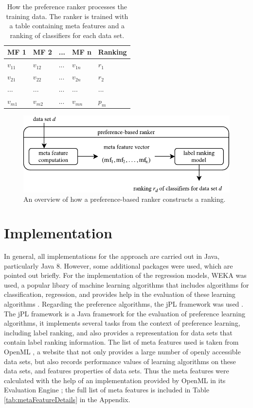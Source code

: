 \begin{table}[h]
\centering
	\begin{tabularx}{\textwidth}{X | X | X | X | X}
		MF 1				& MF 2				& ... 	& MF n				& Ranking 	\\ \hline
		$v_{11}$			& $v_{12}$			& ...	& $v_{1n}$			& $r_1$		\\ 
		$v_{21}$			& $v_{22}$			& ...	& $v_{2n}$			& $r_2$		\\
		...				& ...				& ...	& ...				& ...		\\
		$v_{m1}$			& $v_{m2}$			& ... 	& $v_{mn}$			& $p_m$		 
	\end{tabularx}
	\label{tab:preferenceTable}
	\caption{How the preference ranker processes the training data. The ranker is trained with a table containing meta features and a ranking of classifiers for each data set.}
\end{table}

\begin{figure}
\centering
\includegraphics[scale=1]{gfx/label_ranking_model.pdf}
\caption{An overview of how a preference-based ranker constructs a ranking.}
\label{fig:preference_ranker_model}
\end{figure}

\section{Implementation}
In general, all implementations for the approach are carried out in Java, particularly Java 8. However, some additional packages were used, which are pointed out briefly. For the implementation of the regression models, WEKA was used, a popular libary of machine learning algorithms that includes algorithms for classification, regression, and provides help in the evaluation of these learning algorithms \cite{hall2009weka}. Regarding the preference algorithms, the jPL framework was used \cite{intelligent2017jpl}. The jPL framework is a Java framework for the evaluation of preference learning algorithms, it implements several tasks from the context of preference learning, including label ranking, and also provides a representation for data sets that contain label ranking information. The list of meta features used is taken from OpenML \cite{OpenML2013}, a website that not only provides a large number of openly accessible data sets, but also records performance values of learning algorithms on these data sets, and features properties of data sets. Thus the meta features were calculated with the help of an implementation provided by OpenML in its Evaluation Engine \cite{openMLEvaluationEngine}; the full list of meta features is included in Table \ref{tab:metaFeatureDetails} in the Appendix.